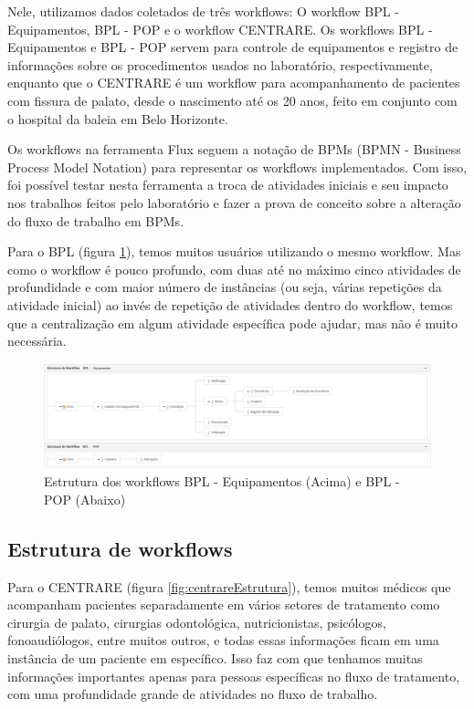 Nele, utilizamos dados coletados de três workflows: O workflow BPL - Equipamentos, BPL - POP e o workflow CENTRARE. Os workflows BPL - Equipamentos e BPL - POP servem para controle de equipamentos e registro de informações sobre os procedimentos usados no laboratório, respectivamente, enquanto que o CENTRARE é um workflow para acompanhamento de pacientes com fissura de palato, desde o nascimento até os 20 anos, feito em conjunto com o hospital da baleia em Belo Horizonte.

Os workflows na ferramenta Flux seguem a notação de BPMs (BPMN - Business Process Model Notation) para representar os workflows implementados. Com isso, foi possível testar nesta ferramenta a troca de atividades iniciais e seu impacto nos trabalhos feitos pelo laboratório e fazer a prova de conceito sobre a alteração do fluxo de trabalho em BPMs.

Para o BPL (figura \ref{fig:bplEstrutura}), temos muitos usuários utilizando o mesmo workflow. Mas como o workflow é pouco profundo, com duas até no máximo cinco atividades de profundidade e com maior número de instâncias (ou seja, várias repetições da atividade inicial) ao invés de repetição de atividades dentro do workflow, temos que a centralização em algum atividade específica pode ajudar, mas não é muito necessária.

\begin{figure}
    \centering
    \includegraphics[width=1\textwidth]{imgs/BPL/estrutura.png}
    \caption{Estrutura dos workflows BPL - Equipamentos (Acima) e BPL - POP (Abaixo)}
    \label{fig:bplEstrutura}
\end{figure}

\subsection{Estrutura de workflows}

Para o CENTRARE (figura \ref{fig:centrareEstrutura}), temos muitos médicos que acompanham pacientes separadamente em vários setores de tratamento como cirurgia de palato, cirurgias odontológica, nutricionistas, psicólogos, fonoaudiólogos, entre muitos outros, e todas essas informações ficam em uma instância de um paciente em específico. Isso faz com que tenhamos muitas informações importantes apenas para pessoas específicas no fluxo de tratamento, com uma profundidade grande de atividades no fluxo de trabalho.


